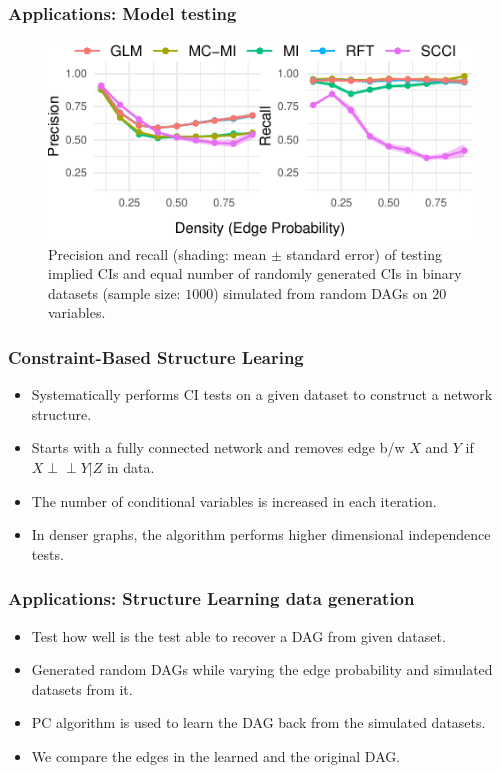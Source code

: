 \documentclass{beamer}
\def\ci{\perp\!\!\!\!\!\perp}
\begin{document}
\begin{frame}
	\frametitle{Applications: Model testing}
	\begin{figure}
		\centering
		\includegraphics{imgs/model_testing.pdf}
		\caption*{Precision and recall (shading: mean $\pm$ standard
		error) of testing implied CIs and equal number of randomly
		generated CIs in binary datasets (sample size: $1000$)
		simulated from random DAGs on $ 20 $ variables.}
	\end{figure}
\end{frame}

\begin{frame}
	\frametitle{Constraint-Based Structure Learing}
	\begin{itemize}
		\item Systematically performs CI tests on a given dataset to construct a network structure.
		\item Starts with a fully connected network and removes edge b/w $ X $ and $ Y $  if $ X \ci Y | Z $ in data.
		\item The number of conditional variables is increased in each iteration.
		\item In denser graphs, the algorithm performs higher dimensional independence tests.
	\end{itemize}
\end{frame}

\begin{frame}
	\frametitle{Applications: Structure Learning data generation}
	\begin{itemize}
		\item Test how well is the test able to recover a DAG from given dataset.
		\item Generated random DAGs while varying the edge probability and simulated datasets from it.
		\item PC algorithm is used to learn the DAG back from the simulated datasets.
		\item We compare the edges in the learned and the original DAG.
	\end{itemize}
\end{frame}
\end{document}
